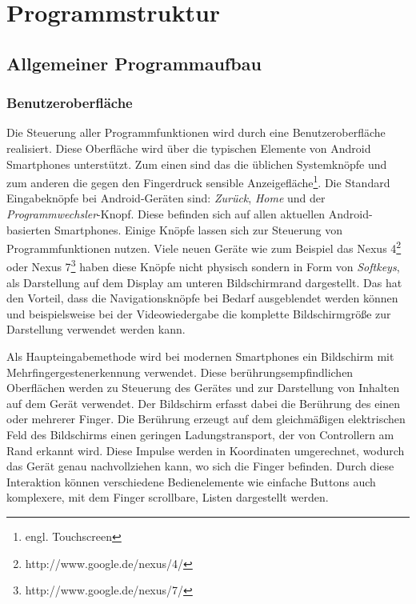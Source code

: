 \section{Programmstruktur}

\subsection{Allgemeiner Programmaufbau}

\subsubsection{Benutzeroberfläche}

Die Steuerung aller Programmfunktionen wird durch eine Benutzeroberfläche realisiert. Diese Oberfläche wird über die typischen Elemente von Android Smartphones unterstützt. Zum einen sind das die üblichen Systemknöpfe und zum anderen die gegen den Fingerdruck sensible Anzeigefläche\footnote{engl. Touchscreen}. Die Standard Eingabeknöpfe bei Android-Geräten sind: \textit{Zurück}, \textit{Home} und der \textit{Programmwechsler}-Knopf. Diese befinden sich auf allen aktuellen Android-basierten Smartphones. Einige Knöpfe lassen sich zur Steuerung von Programmfunktionen nutzen. Viele neuen Geräte wie zum Beispiel das Nexus 4\footnote{http://www.google.de/nexus/4/} oder Nexus 7\footnote{http://www.google.de/nexus/7/} haben diese Knöpfe nicht physisch sondern in Form von \emph{Softkeys}, als Darstellung auf dem Display am unteren Bildschirmrand dargestellt. Das hat den Vorteil, dass die Navigationsknöpfe bei Bedarf ausgeblendet werden können und beispielsweise bei der Videowiedergabe die komplette Bildschirmgröße zur Darstellung verwendet werden kann.

Als Haupteingabemethode wird bei modernen Smartphones ein Bildschirm mit Mehrfingergestenerkennung verwendet. Diese berührungsempfindlichen Oberflächen werden zu Steuerung des Gerätes und zur Darstellung von Inhalten auf dem Gerät verwendet. Der Bildschirm erfasst dabei die Berührung des einen oder mehrerer Finger. Die Berührung erzeugt auf dem gleichmäßigen elektrischen Feld des Bildschirms einen geringen Ladungstransport, der von Controllern am Rand erkannt wird. Diese Impulse werden in Koordinaten umgerechnet, wodurch das Gerät genau nachvollziehen kann, wo sich die Finger befinden. Durch diese Interaktion können verschiedene Bedienelemente wie einfache Buttons auch komplexere, mit dem Finger scrollbare, Listen dargestellt werden.

